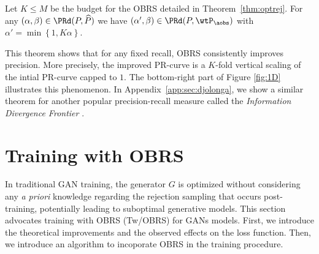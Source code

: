 \documentclass[twoside]{article}
\begin{document}
\begin{theorem}\label{thm:improvalpha}
Let $K\leq M$ be the budget for the OBRS detailed  in Theorem~\ref{thm:optrej}. For any $(\alpha,\beta)\in \PRd(P,\widehat{P})$ we have $\left(\alpha',\beta\right)\in \PRd(P,\wtP_{\aobs})$ with $\alpha'=\min\left\{1,K\alpha\right\}$.
\end{theorem}

This theorem shows that for any fixed recall, OBRS consistently improves precision. More precisely,  the improved PR-curve is a $K$-fold vertical scaling of the intial PR-curve capped to $1$. The bottom-right part of Figure \ref{fig:1D} illustrates this phenomenon.
In Appendix~\ref{app:sec:djolonga}, we show a similar theorem for another popular precision-recall measure called the \emph{Information Divergence Frontier} \citep{djolonga_precision-recall_2020}.

\begin{comment}


\begin{algorithm}[b!]
\caption{Optimal Budgeted Rejection Sampling}
\label{alg:OBRS}
\textbf{Input}: Number of Samples $N$, Budget $K$, a model $\whP$ and a target  distribution $P$ \\
\textbf{Output}: $N$ samples generated from the refined distribution $\wtP_{\aobs}$
\begin{algorithmic}[1] \State Compute $M = \max r(\vx)$ using samples from $\whP$
\State Compute $c_K$ using Algorithm~\ref{alg:searchc} in Appendix \ref{app:subsec:algoc}
\State Number of accepted samples: $n_a\leftarrow 0$
\While{ $n_a<N$}
\State Draw a sample: $\vx^{\mathrm{fake}}\sim \whP$
\State Draw a random number: $u\sim \cal U\left[0, 1\right]$
\State Estimate the likelihood ratio: $$r(\vx)= \nabla f\s (\T(\vx))$$

\If {$u\geq \aobs(\vx) = \min(r(\vx)\frac{c_K}{M},\, 1)$}
\State Keep $\vx^{\mathrm{fake}}$ and $n_a\leftarrow n_a+1$
\EndIf
\EndWhile

\end{algorithmic}
\end{algorithm}
\end{comment}











\section{Training with OBRS}\label{sec:trainobrs}
In traditional GAN training, the generator $G$ is optimized without considering any \textit{a priori} knowledge regarding the rejection sampling that occurs post-training, potentially leading to suboptimal generative models. This section advocates training with OBRS (Tw/OBRS) for GANs models. First, we introduce the theoretical improvements and the observed effects on the loss function.  Then, we introduce an algorithm to incoporate OBRS in the training procedure.
\end{document}
